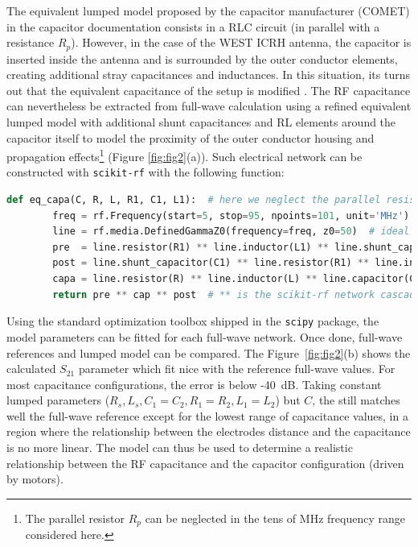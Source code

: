 \documentclass{aip-cp}
\begin{document}
	
	The equivalent lumped model proposed by the capacitor manufacturer (COMET) in the capacitor documentation consists in a RLC circuit (in parallel with a resistance $R_p$). 
	However, in the case of the WEST ICRH antenna, the capacitor is inserted inside the antenna and is surrounded by the outer conductor elements, creating additional stray capacitances and inductances. In this situation, its turns out that the equivalent capacitance of the setup is modified \cite{Helou2018_PhD}. The RF capacitance can nevertheless be extracted from full-wave calculation using a refined equivalent lumped model with additional shunt capacitances and RL elements around the capacitor itself to model the proximity of the outer conductor housing and propagation effects\footnote{The parallel resistor $R_p$ can be neglected in the tens of MHz frequency range considered here.} (Figure \ref{fig:fig2}(a)). Such electrical network can be constructed with \texttt{scikit-rf} with the following function:
	
	\begin{lstlisting}[language=Python]
	def eq_capa(C, R, L, R1, C1, L1):  # here we neglect the parallel resistance R_p
		freq = rf.Frequency(start=5, stop=95, npoints=101, unit='MHz')
		line = rf.media.DefinedGammaZ0(frequency=freq, z0=50)  # ideal transmission line media
		pre  = line.resistor(R1) ** line.inductor(L1) ** line.shunt_capacitor(C1)
		post = line.shunt_capacitor(C1) ** line.resistor(R1) ** line.inductor(L1)
		capa = line.resistor(R) ** line.inductor(L) ** line.capacitor(C)
		return pre ** cap ** post  # ** is the scikit-rf network cascading operator
	\end{lstlisting}
	
	Using the standard optimization toolbox shipped in the \texttt{scipy} package, the model parameters can be fitted for each full-wave network. Once done, full-wave references and lumped model can be compared. The Figure~\ref{fig:fig2}(b) shows the calculated $S_{21}$ parameter which fit nice with the reference full-wave values. For most capacitance configurations, the error is below -40~dB. Taking constant lumped parameters ($R_s, L_s, C_1=C_2, R_1=R_2, L_1=L_2$) but $C$, the still matches well the full-wave reference except for the lowest range of capacitance values, in a region where the relationship between the electrodes distance and the capacitance is no more linear. The model can thus be used to determine a realistic relationship between the RF capacitance and the capacitor configuration (driven by motors).
	
\end{document}
